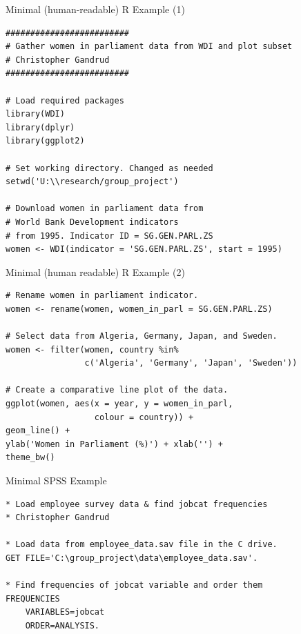 \documentclass[10pt]{beamer}
\begin{document}
\begin{frame}[fragile]{Minimal (human-readable) R Example (1)}

\begin{lstlisting}
#########################
# Gather women in parliament data from WDI and plot subset
# Christopher Gandrud
#########################

# Load required packages
library(WDI)
library(dplyr)
library(ggplot2)

# Set working directory. Changed as needed
setwd('U:\\research/group_project')

# Download women in parliament data from
# World Bank Development indicators
# from 1995. Indicator ID = SG.GEN.PARL.ZS
women <- WDI(indicator = 'SG.GEN.PARL.ZS', start = 1995)
\end{lstlisting}

\end{frame}

\begin{frame}[fragile]{Minimal (human readable) R Example (2)}

\begin{lstlisting}
# Rename women in parliament indicator.
women <- rename(women, women_in_parl = SG.GEN.PARL.ZS)

# Select data from Algeria, Germany, Japan, and Sweden.
women <- filter(women, country %in%
                c('Algeria', 'Germany', 'Japan', 'Sweden'))

# Create a comparative line plot of the data.
ggplot(women, aes(x = year, y = women_in_parl,
                  colour = country)) +
geom_line() +
ylab('Women in Parliament (%)') + xlab('') +
theme_bw()
\end{lstlisting}

\end{frame}


\begin{frame}[fragile]{Minimal SPSS Example}

\begin{lstlisting}
* Load employee survey data & find jobcat frequencies
* Christopher Gandrud

* Load data from employee_data.sav file in the C drive.
GET FILE='C:\group_project\data\employee_data.sav'.

* Find frequencies of jobcat variable and order them
FREQUENCIES
    VARIABLES=jobcat
    ORDER=ANALYSIS.
\end{lstlisting}

\end{frame}
\end{document}
